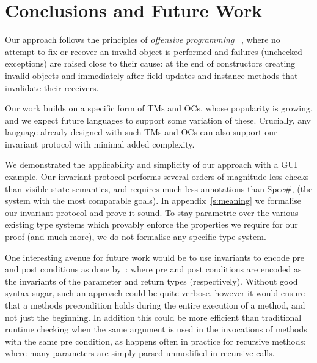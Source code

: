 
\section{Conclusions and Future Work}
\label{s:conclusion}
Our approach follows the principles of \emph{offensive programming}
~\cite{stephens2015beginning}, where 
no attempt to fix or recover an invalid object is performed and
 failures (unchecked exceptions)
		are raised close to their cause: at the end of constructors creating invalid objects and immediately after field updates and instance methods that invalidate their receivers.



Our work builds on a specific form of TMs and OCs, whose
popularity is growing, and we expect future languages to support some variation of these.
Crucially, any language already designed with such TMs and OCs
can also support our invariant protocol with minimal added complexity.


We demonstrated the applicability and simplicity of our approach with a GUI example.
Our invariant protocol performs several orders of magnitude less checks than visible state semantics, and requires much less annotations 
than Spec\#, (the system with the most comparable goals).
In appendix~\ref{s:meaning} we formalise our invariant protocol and prove it sound. To stay parametric over the various existing type systems which provably enforce the properties we require for our proof (and much more), we do not formalise any specific type system.


One interesting avenue for future work would be to
use invariants to encode pre and post conditions
as done by~\cite{Flanagan06hybridtypes}: where pre and post conditions are encoded as the invariants of the parameter and return types (respectively).
Without good syntax sugar, such an approach could be quite verbose, however it would ensure that a methods precondition holds during the entire execution of a method, and not just the beginning. In addition this could be more efficient than traditional runtime checking when the same argument is used in the invocations of methods with the same pre condition, as happens often in practice for recursive methods: where many parameters are simply parsed unmodified in recursive calls.

